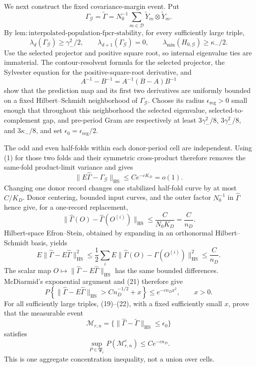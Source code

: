 We next construct the fixed covariance-margin event.  Put
\[
 \Gamma_{\mathcal G}=\widetilde\Gamma
 =N_0^{-1}\sum_{m\in\mathcal D}
   \widetilde Y_m\otimes\widetilde Y_m.
\]
By
\(\mathrm{lem:interpolated\mbox{-}population\mbox{-}fpcr\mbox{-}stability}\),
for every sufficiently large triple,
\[
 \lambda_d(\Gamma_{\mathcal G})\geq\gamma_-^2/2,
 \qquad \lambda_{d+1}(\Gamma_{\mathcal G})=0,
 \qquad \lambda_{\min}(H_{0,\mathcal G})\geq\kappa_-/2. \tag{17}
\]
Use the selected projector and positive square root, so internal eigenvalue
ties are immaterial.  The contour-resolvent formula for the selected
projector, the Sylvester equation for the positive-square-root derivative,
and
\[
 A^{-1}-B^{-1}=A^{-1}(B-A)B^{-1}                       \tag{18}
\]
show that the prediction map and its first two derivatives are uniformly
bounded on a fixed Hilbert--Schmidt neighborhood of
\(\Gamma_{\mathcal G}\).  Choose its radius
\(\epsilon_{\mathrm{reg}}>0\) small enough that throughout this neighborhood
the selected eigenvalue, selected-to-complement gap, and pre-period Gram are
respectively at least \(3\gamma_-^2/8\), \(3\gamma_-^2/8\), and
\(3\kappa_-/8\), and set \(\epsilon_0=\epsilon_{\mathrm{reg}}/2\).

The odd and even half-folds within each donor-period cell are independent.
Using (1) for those two folds and their symmetric cross-product therefore
removes the same-fold product-limit variance and gives
\[
 \|E\widehat\Gamma-\Gamma_{\mathcal G}\|_{\mathrm{HS}}
 \leq Ce^{-cK_D}=o(1).                                 \tag{19}
\]
Changing one donor record changes one stabilized half-fold curve by at most
\(C/K_D\).  Donor centering, bounded input curves, and the outer factor
\(N_0^{-1}\) in \(\widehat\Gamma\) hence give, for a one-record replacement,
\[
 \|\widehat\Gamma(O)-\widehat\Gamma(O^{(i)})\|_{\mathrm{HS}}
 \leq\frac{C}{N_0K_D}=\frac{C}{n_D}.                  \tag{20}
\]
Hilbert-space Efron--Stein, obtained by expanding in an orthonormal
Hilbert--Schmidt basis, yields
\[
 E\|\widehat\Gamma-E\widehat\Gamma\|_{\mathrm{HS}}^2
 \leq\frac12\sum_iE
 \|\widehat\Gamma(O)-\widehat\Gamma(O^{(i)})\|_{\mathrm{HS}}^2
 \leq\frac{C}{n_D}.                                   \tag{21}
\]
The scalar map
\(O\mapsto\|\widehat\Gamma-E\widehat\Gamma\|_{\mathrm{HS}}\)
has the same bounded differences.  McDiarmid's exponential argument and
(21) therefore give
\[
 P\left\{\|\widehat\Gamma-E\widehat\Gamma\|_{\mathrm{HS}}
 >Cn_D^{-1/2}+x\right\}\leq e^{-cn_Dx^2},
 \qquad x>0.                                           \tag{22}
\]
For all sufficiently large triples, (19)--(22), with a fixed sufficiently
small \(x\), prove that the measurable event
\[
 \mathcal M_{r,n}
 =\{\|\widehat\Gamma-\widetilde\Gamma\|_{\mathrm{HS}}
       \leq\epsilon_0\}                                \tag{23}
\]
satisfies
\[
 \sup_{P\in\mathfrak P_r}P(\mathcal M_{r,n}^c)
 \leq Ce^{-cn_D}.                                      \tag{24}
\]
This is one aggregate concentration inequality, not a union over cells.


